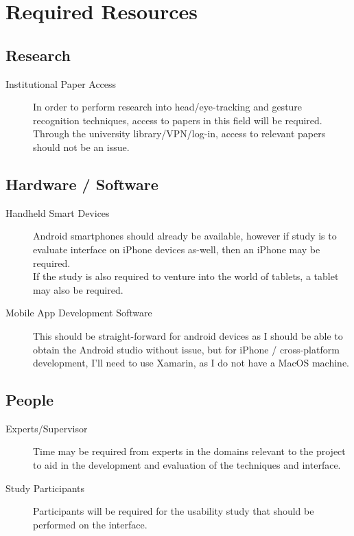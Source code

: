 \section{Required Resources}

\subsection{Research}
\begin{description}
    \item[Institutional Paper Access] In order to perform research into head/eye-tracking and gesture recognition techniques, access to papers in this field will be required. Through the university library/VPN/log-in, access to relevant papers should not be an issue.
\end{description}

\subsection{Hardware / Software}
\begin{description}
    \item[Handheld Smart Devices] Android smartphones should already be available, however if study is to evaluate interface on iPhone devices as-well, then an iPhone may be required.\\
        If the study is also required to venture into the world of tablets, a tablet may also be required.
    \item[Mobile App Development Software] This should be straight-forward for android devices as I should be able to obtain the Android studio without issue, but for iPhone / cross-platform development, I'll need to use Xamarin, as I do not have a MacOS machine.
\end{description}

\subsection{People}
\begin{description}
    \item[Experts/Supervisor] Time may be required from experts in the domains relevant to the project to aid in the development and evaluation of the techniques and interface.
    \item[Study Participants] Participants will be required for the usability study that should be performed on the interface.
\end{description}